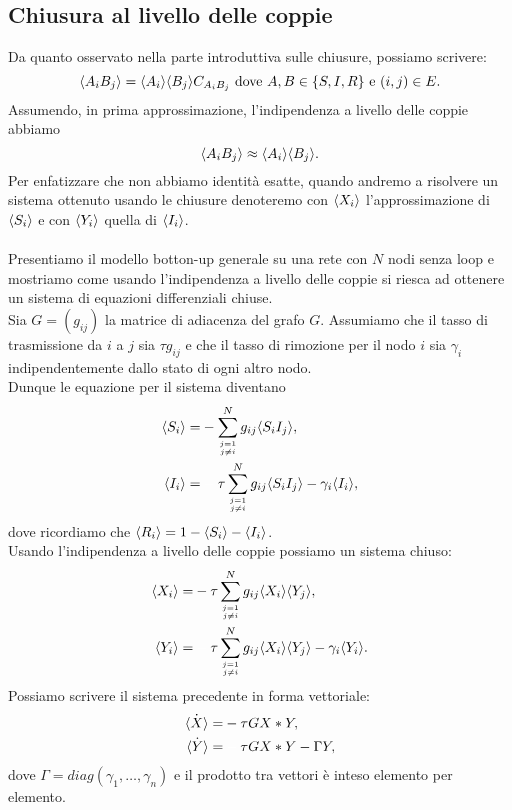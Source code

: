 \subsection{Chiusura al livello delle coppie}
Da quanto osservato nella parte introduttiva sulle chiusure, possiamo scrivere:
$$ \langle  A_i B_j \rangle = \langle  A_i \rangle \langle B_j \rangle C_{A_i B_j} \text{ dove } A,B\in \{S,I,R\} \text{ e } (i,j)\in E.$$ 
Assumendo, in prima approssimazione, l'indipendenza a livello delle coppie abbiamo 
$$ \langle  A_i B_j \rangle \approx \langle A_i \rangle\langle B_j \rangle.$$ 
Per enfatizzare che non abbiamo identit\`a esatte, quando andremo a risolvere un sistema ottenuto usando le chiusure denoteremo  con $\langle X_i \rangle$ l'approssimazione di $\langle  S_i \rangle$ e con $\langle  Y_i \rangle$ quella di $\langle  I_i \rangle$.\\ \\
Presentiamo il modello botton-up generale su una rete con $N$ nodi senza loop e mostriamo come usando l'indipendenza a livello delle coppie si riesca ad ottenere un sistema di equazioni differenziali chiuse.\\
Sia $G=(g_{ij})$ la matrice di adiacenza del grafo $G$. Assumiamo che il tasso di trasmissione da $i$ a $j$ sia $\tau g_{ij}$ e che il tasso di rimozione per il nodo $i$ sia $\gamma_i$ indipendentemente dallo stato di ogni altro nodo.\\
Dunque le equazione per il sistema diventano
\begin{equation}
\begin{aligned}
	 \angol{ S_i} =& - \sum_{j=1\atop{j\neq i }}^N g_{ij} \angol{ S_i I_j},\\
	 \angol{I_i} =&\spa \tau \sum_{j=1\atop{j\neq i}}^N  g_{ij} \angol{ S_i I_j} -\gamma_i \angol{I_i},
\end{aligned}
\end{equation}
dove ricordiamo che $\langle R_i \rangle=1-\langle S_i \rangle- \langle I_i \rangle$.\\
Usando l'indipendenza a livello delle coppie possiamo un sistema chiuso: 
\begin{equation}
\begin{aligned}
	 \angol{ X_i} =& -\tau \sum_{j=1\atop{j\neq i }}^N g_{ij}\angol{ X_i} \angol{Y_j},\\
	 \angol{Y_i} =&\spa \tau \sum_{j=1\atop{j\neq i}}^N  g_{ij}\angol{ X_i}\angol{Y_j} -\gamma_i \angol{Y_i}.
\end{aligned}
\label{Coppie3nodi}
\end{equation}
Possiamo scrivere il sistema precedente in forma vettoriale:
\begin{equation}
	\begin{aligned}
	\dot{\angol{X}} = & - \tau G X * Y,\\
	\dot{\angol{Y}}=& \spa \tau G X * Y - \Gamma Y,	
	\end{aligned}
\end{equation}
dove $\Gamma=diag(\gamma_1, \dots, \gamma_n)$ e il prodotto tra vettori \`e inteso elemento per elemento.\\

